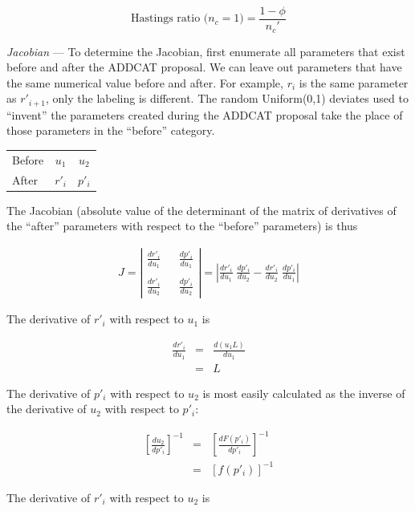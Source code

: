 \documentclass[12pt]{article}
\newcommand{\ncat}{n_c}
\begin{document}
\[ \mbox{Hastings ratio ($\ncat = 1$)} = \frac{1-\phi}{\ncat'} \]

{\em Jacobian} --- To determine the Jacobian, first enumerate all parameters that exist before and after the ADDCAT proposal. We can leave out parameters that have the same numerical value before and after. For example, $r_{i}$ is the same parameter as $r'_{i+1}$, only the labeling is different. The random Uniform(0,1) deviates used to ``invent'' the parameters created during the ADDCAT proposal take the place of those parameters in the ``before'' category.

\begin{center}
\begin{tabular}{lcc}
Before & $u_1$  & $u_2$ \\
After  & $r'_i$ & $p'_i$
\end{tabular}
\end{center}

The Jacobian (absolute value of the determinant of the matrix of derivatives of the ``after'' parameters with respect to the ``before'' parameters) is thus

\begin{eqnarray*}
J = \left| 
\begin{array}{ccc}
\frac{d r'_i}{d u_1} & & \frac{d p'_i}{d u_1} \\
& & \\
\frac{d r'_i}{d u_2} & & \frac{d p'_i}{d u_2}
\end{array}
\right|
= \left| \frac{d r'_i}{d u_1} \; \frac{d p'_i}{d u_2} - \frac{d r'_i}{d u_2} \; \frac{d p'_i}{d u_1} \right|
\end{eqnarray*}

The derivative of $r'_i$ with respect to $u_1$ is

\begin{eqnarray*}
\frac{d r'_i}{d u_1} & = & \frac{d (u_1 L)}{d u_1} \\
& = & L
\end{eqnarray*}

The derivative of $p'_i$ with respect to $u_2$ is most easily calculated as the inverse of the derivative of $u_2$ with respect to $p'_i$:

\begin{eqnarray*}
\left[ \frac{d u_2}{d p'_i} \right]^{-1} & = & \left[ \frac{d F(p'_i)}{d p'_i} \right]^{-1} \\
& = & \left[ f(p'_i) \right]^{-1}
\end{eqnarray*}

The derivative of $r'_i$ with respect to $u_2$ is 
\end{document}
